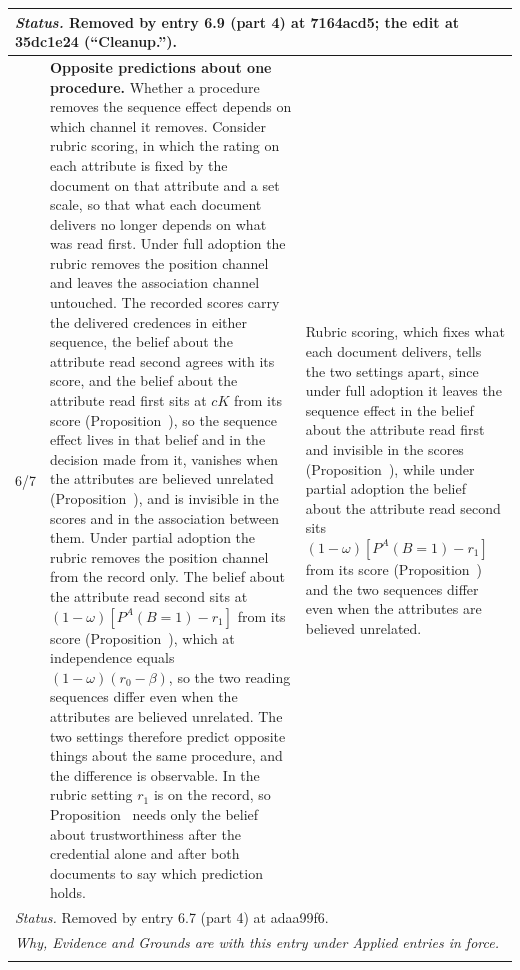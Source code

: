\documentclass[10pt]{article}
\theoremstyle{definition}
\renewcommand{\ref}[1]{\textsc{\detokenize{#1}}}
\newlength{\fullw}\setlength{\fullw}{25.9cm}
\begin{document}
{\begin{longtable}{|p{0.9cm}|p{12.2cm}|p{12.2cm}|}
\multicolumn{3}{|p{\fullw}|}{\textit{Status.} Removed by entry 6.9 (part 4) at 7164acd5; the edit at 35dc1e24 (``Cleanup.'').} \\ \hline
6/7 & \textbf{Opposite predictions about one procedure.}  Whether a procedure removes the sequence effect depends on which channel it removes. Consider rubric scoring, in which the rating on each attribute is fixed by the document on that attribute and a set scale, so that what each document delivers no longer depends on what was read first. Under full adoption the rubric removes the position channel and leaves the association channel untouched. The recorded scores carry the delivered credences in either sequence, the belief about the attribute read second agrees with its score, and the belief about the attribute read first sits at $cK$ from its score (Proposition~\ref{prop:DRF}), so the sequence effect lives in that belief and in the decision made from it, vanishes when the attributes are believed unrelated (Proposition~\ref{prop:IMM}), and is invisible in the scores and in the association between them. Under partial adoption the rubric removes the position channel from the record only. The belief about the attribute read second sits at $(1-\omega)[P^{A}(B{=}1)-r_1]$ from its score (Proposition~\ref{prop:ADJ}), which at independence equals $(1-\omega)(r_0-\beta)$, so the two reading sequences differ even when the attributes are believed unrelated. The two settings therefore predict opposite things about the same procedure, and the difference is observable. In the rubric setting $r_1$ is on the record, so Proposition~\ref{prop:ADJ} needs only the belief about trustworthiness after the credential alone and after both documents to say which prediction holds. & Rubric scoring, which fixes what each document delivers, tells the two settings apart, since under full adoption it leaves the sequence effect in the belief about the attribute read first and invisible in the scores (Proposition~\ref{prop:DRF}), while under partial adoption the belief about the attribute read second sits $(1-\omega)[P^{A}(B{=}1)-r_1]$ from its score (Proposition~\ref{prop:ADJ}) and the two sequences differ even when the attributes are believed unrelated. \\ \hline
\multicolumn{3}{|p{\fullw}|}{\textit{Status.} Removed by entry 6.7 (part 4) at adaa99f6.} \\ \hline
\multicolumn{3}{|p{\fullw}|}{\textit{Why, Evidence and Grounds are with this entry under Applied entries in force.}} \\ \hline
\multicolumn{3}{|l|}{} \\ \hline

\end{longtable}}
\end{document}
